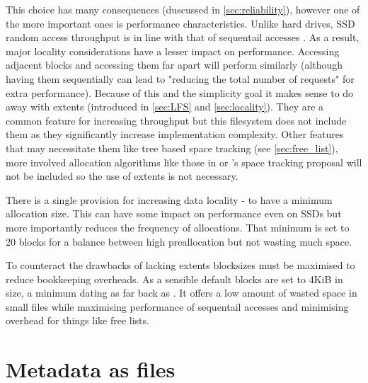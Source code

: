         This choice has many consequences (duscussed in \autoref{sec:reliability}),
        however one of the more important ones is performance characteristics.
        Unlike hard drives, SSD random access throughput is in line with that
        of sequentail accesses \cite{servethehome_review}. As a result, major
        locality considerations have a lesser impact on performance. Accessing
        adjacent blocks and accessing them far apart will perform similarly
        (although having them sequentially can lead to "reducing the total
        number of requests" \cite{ext4_docs} for extra performance). Because of
        this and the simplicity goal it makes sense to do away with extents
        (introduced in \autoref{sec:LFS} and \autoref{sec:locality}). They are a common
        feature for increasing throughput but this filesystem does not include
        them as they significantly increase implementation complexity. Other
        features that may necessitate them like tree based space tracking (see
        \autoref{sec:free_list}), more involved allocation algorithms like those in
         or 's space tracking
        proposal will not be included so the use of extents is not necessary.

        There is a single provision for increasing data locality - to have a
        minimum allocation size. This can have some impact on performance even
        on SSDs but more importantly reduces the frequency of allocations. That
        minimum is set to 20 blocks for a balance between high preallocation
        but not wasting much space.

        To counteract the drawbacks of lacking extents blocksizes must be
        maximised to reduce bookkeeping overheads. As a sensible default blocks
        are set to 4KiB in size, a minimum dating as far back as 
        . It offers a low amount of wasted space in small files
        while maximising performance of sequentail accesses and minimising
        overhead for things like free lists.

    \section{Metadata as files}
        \label{sec:files}

